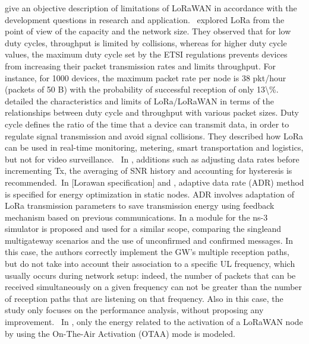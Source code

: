 \citet{adelantado_understanding_2017} give an objective description of limitations of LoRaWAN in accordance with the development questions in research and application.~\citet{adelantado_understanding_2017} explored LoRa from the point of view of the capacity and the network size. They observed that for low duty cycles, throughput is limited by collisions, whereas for higher duty cycle values, the maximum duty cycle set by the ETSI regulations prevents devices from increasing their packet transmission rates and limits throughput. For instance, for 1000 devices, the maximum packet rate per node is 38 pkt/hour (packets of 50 B) with the probability of successful reception of only 13\textbackslash\%.~\citet{adelantado_understanding_2017} detailed the characteristics and limits of LoRa/LoRaWAN in terms of the relationships between duty cycle and throughput with various packet sizes. Duty cycle defines the ratio of the time that a device can transmit data, in order to regulate signal transmission and avoid signal collisions. They described how LoRa can be used in real-time monitoring, metering, smart transportation and logistics, but not for video surveillance.~   \newline 
 \cite{hauser_proposal_2017}   In \cite{hauser_proposal_2017}, additions such as adjusting data rates before incrementing Tx, the averaging of SNR history and accounting for hysteresis is recommended.~In [Lorawan specification] and \cite{hauser_proposal_2017}, adaptive data rate (ADR) method is specified for energy optimization in static nodes. ADR involves adaptation of LoRa transmission parameters to save transmission energy using feedback mechanism based on previous communications.   \newline 
 \cite{reynders_lorawan_2018}   In \cite{reynders_lorawan_2018} a module for the ns-3 simulator is proposed and used for a similar scope, comparing the singleand multigateway scenarios and the use of unconfirmed and confirmed messages. In this case, the authors correctly implement the GW's multiple reception paths, but do not take into account their association to a specific UL frequency, which usually occurs during network setup: indeed, the number of packets that can be received simultaneously on a given frequency can not be greater than the number of reception paths that are listening on that frequency. Also in this case, the study only focuses on the performance analysis, without proposing any improvement.~   \newline 
 \cite{toussaint_performance_2016}   In \cite{toussaint_performance_2016}, only the energy related to the activation of a LoRaWAN node by using the On-The-Air Activation (OTAA) mode is modeled.~   \newline 
